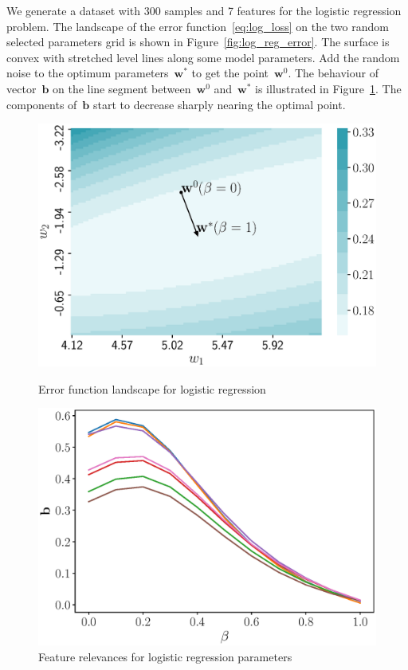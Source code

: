 \documentclass[a4paper,12pt]{article}
\theoremstyle{plain} %
\theoremstyle{definition} %
\theoremstyle{remark} %
\newcommand{\bb}{\mathbf{b}}
\newcommand{\bw}{\mathbf{w}}
\begin{document}
We generate a dataset with 300 samples and 7 features for the logistic regression problem. 
The landscape of the error function~\eqref{eq:log_loss} on the two random selected parameters grid is shown in Figure~\ref{fig:log_reg_error}.
The surface is convex with stretched level lines along some model parameters.
Add the random noise to the optimum parameters~$\bw^*$ to get the point~$\bw^0$. The behaviour of vector~$\bb$ on the line segment between~$\bw^0$ and~$\bw^*$ is illustrated in Figure~\ref{fig:log_reg_b_wrt_beta}.
The components of~$\bb$ start to decrease sharply nearing the optimal point.
\begin{figure}
	\centering
	\begin{minipage}{.5\textwidth}
		\centering
		\includegraphics[width=\linewidth]{figs/log_reg_error}
		\caption{Error function landscape for logistic regression}
		\label{fig:log_reg_error}
	\end{minipage}%
	\begin{minipage}{.5\textwidth}
		\centering
		\includegraphics[width=\linewidth]{figs/log_reg_b_wrt_beta.eps}
		\caption{Feature relevances for logistic regression parameters}
		\label{fig:log_reg_b_wrt_beta}
	\end{minipage}
\end{figure}
\end{document}
